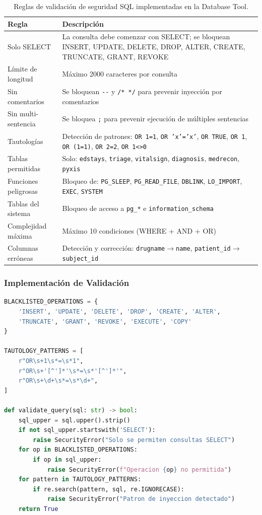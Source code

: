 \begin{table}[H]
\centering
\caption{Reglas de validación de seguridad \acs{SQL} implementadas en la Database Tool.}
\label{tab:appendix_sqlsec}
\footnotesize
\begin{tabularx}{\columnwidth}{lX}
\toprule
\textbf{Regla} & \textbf{Descripción} \\
\midrule
Solo SELECT & La consulta debe comenzar con SELECT; se bloquean INSERT, UPDATE, DELETE, DROP, ALTER, CREATE, TRUNCATE, GRANT, REVOKE \\
Límite de longitud & Máximo 2000 caracteres por consulta \\
Sin comentarios & Se bloquean \texttt{-{}-} y \texttt{/* */} para prevenir inyección por comentarios \\
Sin multi-sentencia & Se bloquea \texttt{;} para prevenir ejecución de múltiples sentencias \\
Tautologías & Detección de patrones: \texttt{OR 1=1}, \texttt{OR 'x'='x'}, \texttt{OR TRUE}, \texttt{OR 1}, \texttt{OR (1=1)}, \texttt{OR 2=2}, \texttt{OR 1<>0} \\
Tablas permitidas & Solo: \texttt{edstays}, \texttt{triage}, \texttt{vitalsign}, \texttt{diagnosis}, \texttt{medrecon}, \texttt{pyxis} \\
Funciones peligrosas & Bloqueo de: \texttt{PG\_SLEEP}, \texttt{PG\_READ\_FILE}, \texttt{DBLINK}, \texttt{LO\_IMPORT}, \texttt{EXEC}, \texttt{SYSTEM} \\
Tablas del sistema & Bloqueo de acceso a \texttt{pg\_*} e \texttt{information\_schema} \\
Complejidad máxima & Máximo 10 condiciones (WHERE + AND + OR) \\
Columnas erróneas & Detección y corrección: \texttt{drugname}$\to$\texttt{name}, \texttt{patient\_id}$\to$\texttt{subject\_id} \\
\bottomrule
\end{tabularx}
\end{table}

\subsubsection{Implementación de Validación}

\begin{lstlisting}[language=Python, basicstyle=\tiny\ttfamily, backgroundcolor=\color{codebg}]
BLACKLISTED_OPERATIONS = {
    'INSERT', 'UPDATE', 'DELETE', 'DROP', 'CREATE', 'ALTER',
    'TRUNCATE', 'GRANT', 'REVOKE', 'EXECUTE', 'COPY'
}

TAUTOLOGY_PATTERNS = [
    r"OR\s+1\s*=\s*1",
    r"OR\s+'[^']*'\s*=\s*'[^']*'",
    r"OR\s+\d+\s*=\s*\d+",
]

def validate_query(sql: str) -> bool:
    sql_upper = sql.upper().strip()
    if not sql_upper.startswith('SELECT'):
        raise SecurityError("Solo se permiten consultas SELECT")
    for op in BLACKLISTED_OPERATIONS:
        if op in sql_upper:
            raise SecurityError(f"Operacion {op} no permitida")
    for pattern in TAUTOLOGY_PATTERNS:
        if re.search(pattern, sql, re.IGNORECASE):
            raise SecurityError("Patron de inyeccion detectado")
    return True
\end{lstlisting}

